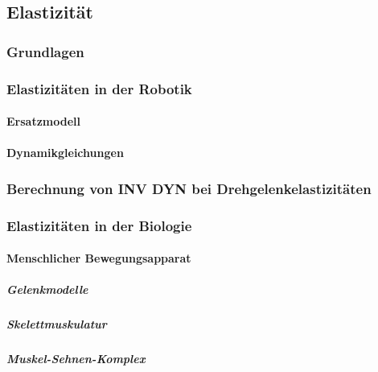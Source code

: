 \documentclass[a4paper, 11pt, accentcolor = tud3b]{tudreport}
\begin{document}
			\subsection{Elastizität} %

				\subsubsection{Grundlagen} %

				\subsubsection{Elastizitäten in der Robotik} %

					\paragraph{Ersatzmodell} %

					\paragraph{Dynamikgleichungen} %

				\subsubsection{Berechnung von INV DYN bei Drehgelenkelastizitäten} %

				\subsubsection{Elastizitäten in der Biologie} %

					\paragraph{Menschlicher Bewegungsapparat} %

						\subparagraph{Gelenkmodelle} %

						\subparagraph{Skelettmuskulatur} %

						\subparagraph{Muskel-Sehnen-Komplex} %
\end{document}
